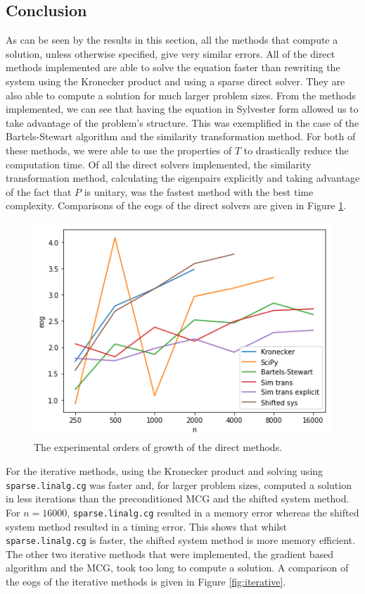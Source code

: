 \documentclass[11pt]{article}
\numberwithin{equation}{section}
\begin{document}
\newpage

\subsection{Conclusion}
As can be seen by the results in this section, all the methods that compute a solution, unless otherwise specified, give very similar errors. All of the direct methods implemented are able to solve the equation faster than rewriting the system using the Kronecker product and using a sparse direct solver. They are also able to compute a solution for much larger problem sizes. From the methods implemented, we can see that having the equation in Sylvester form allowed us to take advantage of the problem's structure. This was exemplified in the case of the Bartels-Stewart algorithm and the similarity transformation method. For both of these methods, we were able to use the properties of $T$ to drastically reduce the computation time. Of all the direct solvers implemented, the similarity transformation method, calculating the eigenpairs explicitly and taking advantage of the fact that $P$ is unitary, was the fastest method with the best time complexity. Comparisons of the eogs of the direct solvers are given in Figure \ref{fig:direct}.

\begin{figure}[H]
\centering
\includegraphics[scale=.6]{img/direct.png}
\caption{The experimental orders of growth of the direct methods.}
\label{fig:direct}
\end{figure}

For the iterative methods, using the Kronecker product and solving using \texttt{sparse.linalg.cg} was faster and, for larger problem sizes, computed a solution in less iterations than the preconditioned MCG and the shifted system method. For $n=16000$, \texttt{sparse.linalg.cg} resulted in a memory error whereas the shifted system method resulted in a timing error. This shows that whilst \texttt{sparse.linalg.cg} is faster, the shifted system method is more memory efficient. The other two iterative methods that were implemented, the gradient based algorithm and the MCG, took too long to compute a solution. A comparison of the eogs of the iterative methods is given in Figure \ref{fig:iterative}.
\end{document}
